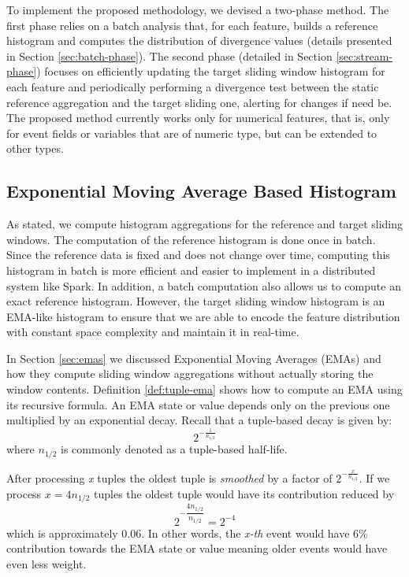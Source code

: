 To implement the proposed methodology, we devised a two-phase method. The first phase relies on a batch analysis that, for each feature, builds a reference histogram and computes the distribution of divergence values (details presented in Section \ref{sec:batch-phase}). The second phase (detailed in Section \ref{sec:stream-phase}) focuses on efficiently updating the target sliding window histogram for each feature and periodically performing a divergence test between the static reference aggregation and the target sliding one, alerting for changes if need be. The proposed method currently works only for numerical features, that is, only for event fields or variables that are of numeric type, but can be extended to other types.


\subsection{Exponential Moving Average Based Histogram} \label{sec:ema-hist}
As stated, we compute histogram aggregations for the reference and target sliding windows. The computation of the reference histogram is done once in batch. Since the reference data is fixed and does not change over time, computing this histogram in batch is more efficient and easier to implement in a distributed system like Spark. In addition, a batch computation also allows us to compute an exact reference histogram. However, the target sliding window histogram is an EMA-like histogram to ensure that we are able to encode the feature distribution with constant space complexity and maintain it in real-time.

In Section \ref{sec:emas} we discussed Exponential Moving Averages (EMAs) and how they compute sliding window aggregations without actually storing the window contents. Definition \ref{def:tuple-ema} shows how to compute an EMA using its recursive formula. An EMA state or value depends only on the previous one multiplied by an exponential decay. Recall that a tuple-based decay is given by:
\[ 2^{- \frac{1}{n_{1/2}}} \]
where $n_{1/2}$ is commonly denoted as a tuple-based half-life. 


After processing \textit{x} tuples the oldest tuple is \emph{smoothed} by a factor of $2^{- \frac{x}{n_{1/2}}}$. If we process $x = 4n_{1/2}$ tuples the oldest tuple would have its contribution reduced by
\[ 2^{- \dfrac{4n_{1/2}}{n_{1/2}}} = 2^{-4} \]
which is approximately 0.06. In other words, the \textit{x-th} event would have 6\% contribution towards the EMA state or value meaning older events would have even less weight.

